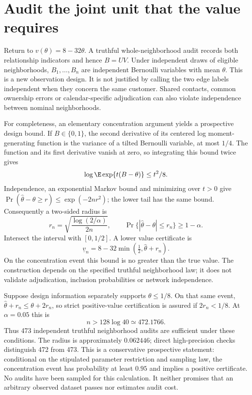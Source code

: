 \section{Audit the joint unit that the value requires}
\label{exec17:s7-audit}

Return to $v(\theta)=8-32\theta$. A truthful whole-neighborhood audit records
both relationship indicators and hence $B=UV$. Under independent draws of
eligible neighborhoods, $B_1,\ldots,B_n$ are independent Bernoulli variables
with mean $\theta$. This is a new observation design. It is not justified by
calling the two edge labels independent when they concern the same customer.
Shared contacts, common ownership errors or calendar-specific adjudication
can also violate independence between nominal neighborhoods.

For completeness, an elementary concentration argument yields a prospective
design bound. If $B\in\{0,1\}$, the second derivative of its centered log
moment-generating function is the variance of a tilted Bernoulli variable,
at most $1/4$. The function and its first derivative vanish at zero, so
integrating this bound twice gives
\begin{equation}
 \log\E\exp\{t(B-\theta)\}\leq t^2/8.
 \label{exec17:s7-mgf}
\end{equation}
Independence, an exponential Markov bound and minimizing over $t>0$ give
$\Pr(\widehat\theta-\theta\geq r)\leq\exp(-2nr^2)$; the lower tail has
the same bound. Consequently a two-sided radius is
\begin{equation}
 r_n=\sqrt{\frac{\log(2/\alpha)}{2n}},\qquad
 \Pr\{|\widehat\theta-\theta|\leq r_n\}\geq1-\alpha.
 \label{exec17:s7-radius}
\end{equation}
Intersect the interval with $[0,1/2]$. A lower value certificate is
\begin{equation}
 \underline v_n=8-32\min(\tfrac12,\widehat\theta+r_n).
 \label{exec17:s7-certificate}
\end{equation}
On the concentration event this bound is no greater than the true value.
The construction depends on the specified truthful neighborhood law; it does
not validate adjudication, inclusion probabilities or network independence.

Suppose design information separately supports $\theta\leq1/8$. On that same
event, $\widehat\theta+r_n\leq\theta+2r_n$, so strict positive-value
certification is assured if $2r_n<1/8$. At $\alpha=0.05$ this is
\begin{equation}
 n>128\log40\simeq472.1766.
 \label{exec17:s7-sample-size}
\end{equation}
Thus 473 independent truthful neighborhood audits are sufficient under these
conditions. The radius is approximately $0.062446$; direct high-precision
checks distinguish 472 from 473. This is a conservative prospective statement:
conditional on the stipulated parameter restriction and sampling law, the
concentration event has probability at least $0.95$ and implies a positive
certificate. No audits have been sampled for this calculation. It neither
promises that an arbitrary observed dataset passes nor estimates audit cost.
\citep{exec17_s7_math}

